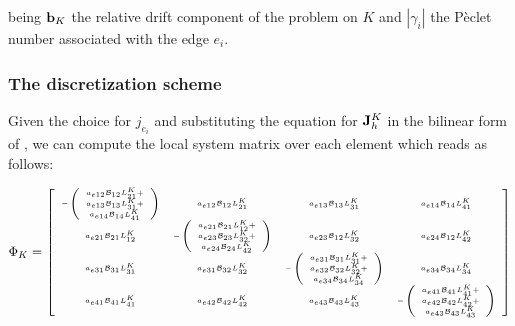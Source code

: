 being $\mathbf{b}_K$ the relative drift component of the problem on $K$ and $|\gamma_i|$ the P\`eclet number associated with the edge $e_i$.  

\subsubsection{The discretization scheme}

Given the choice for $j_{e_i}$ and substituting the equation for $\mathbf{J}_h^K$ in the bilinear form of  , we can compute the local system matrix over each element which reads as follows:

\begin{equation}
\Phi_K  = 
{
\tiny 
\left[
\begin{array}{cccc}
- \left( \begin{array}{c}
a_{e12}\mathcal{B}_{12}L^K_{21} + \\
a_{e13}\mathcal{B}_{13}L^K_{31} + \\
a_{e14}\mathcal{B}_{14}L^K_{41}
\end{array} \right)

& a_{e12}\mathcal{B}_{12}L^K_{21} 
& a_{e13}\mathcal{B}_{13}L^K_{31}
& a_{e14}\mathcal{B}_{14}L^K_{41}
\\

a_{e21}\mathcal{B}_{21}L^K_{12}
&
- \left( \begin{array}{c}
a_{e21}\mathcal{B}_{21}L^K_{12} + \\
a_{e23}\mathcal{B}_{23}L^K_{32} + \\
a_{e24}\mathcal{B}_{24}L^K_{42}
\end{array} \right)
& a_{e23}\mathcal{B}_{12}L^K_{32}
& a_{e24}\mathcal{B}_{12}L^K_{42}
\\

a_{e31}\mathcal{B}_{31}L^K_{31}
& a_{e31}\mathcal{B}_{32}L^K_{32}
&
- \left( \begin{array}{c}
a_{e31}\mathcal{B}_{31}L^K_{31} + \\
a_{e32}\mathcal{B}_{32}L^K_{32} + \\
a_{e34}\mathcal{B}_{34}L^K_{34}
\end{array} \right)

&a_{e34}\mathcal{B}_{34}L^K_{34}
\\

a_{e41}\mathcal{B}_{41}L^K_{41}
& a_{e42}\mathcal{B}_{42}L^K_{42}
&a_{e43}\mathcal{B}_{43}L^K_{43}
&
- \left( \begin{array}{c}
a_{e41}\mathcal{B}_{41}L^K_{41} + \\
a_{e42}\mathcal{B}_{42}L^K_{42} + \\
a_{e43}\mathcal{B}_{43}L^K_{43}
\end{array} \right)

\end{array}
\right]
}
\end{equation}

